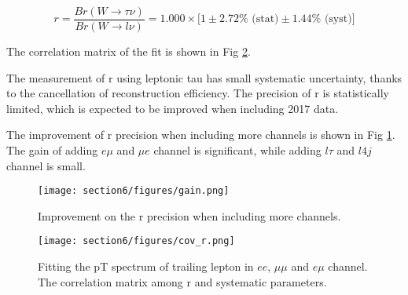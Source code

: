 \begin{equation}
    \boxed{
    r = \frac{Br (W\to \tau \nu)}{Br (W\to l \nu)}
    = 1.000 \times \big[1 \pm 2.72\% \text{ (stat)} \pm 1.44\% \text{ (syst)} \big]
    }
    \label{eqn:fitr}
\end{equation}

The correlation matrix of the fit is shown in Fig \ref{fig:covr}.

The measurement of r using leptonic tau has small systematic uncertainty, thanks to the 
cancellation of reconstruction efficiency. The precision of r is statistically limited, 
which is expected to be improved when including 2017 data.


The improvement of r precision when including more channels is shown in
Fig \ref{fig:gain}. The gain of adding $e\mu$ and $\mu e$ channel is
significant, while adding $l \tau$ and $l4j$ channel is small.

\begin{figure}[H]
    \centering
    \texttt{[image: section6/figures/gain.png]}
    \caption{ Improvement on the r precision when including more channels.}
    \label{fig:gain}
\end{figure}

\begin{figure}[p]
    \centering
    \texttt{[image: section6/figures/cov\_r.png]}
    \caption{Fitting the pT spectrum of trailing lepton in $ee$, $\mu\mu$ and $e\mu$ channel.
    The correlation matrix among r and systematic parameters.
    }
    \label{fig:covr}
\end{figure}